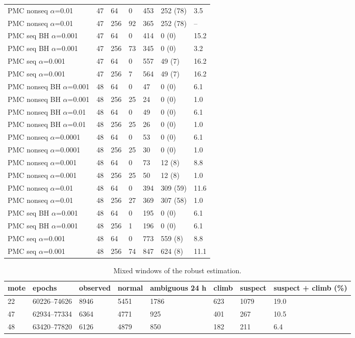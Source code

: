 \begin{table}[ht]
\begin{tabular}{lllllll}
PMC nonseq $\alpha$=0.01 & 47 & 64 & 0 & 453 & 252 (78) & 3.5 \\
PMC nonseq $\alpha$=0.01 & 47 & 256 & 92 & 365 & 252 (78) & -- \\
PMC seq BH $\alpha$=0.001 & 47 & 64 & 0 & 414 & 0 (0) & 15.2 \\
PMC seq BH $\alpha$=0.001 & 47 & 256 & 73 & 345 & 0 (0) & 3.2 \\
PMC seq $\alpha$=0.001 & 47 & 64 & 0 & 557 & 49 (7) & 16.2 \\
PMC seq $\alpha$=0.001 & 47 & 256 & 7 & 564 & 49 (7) & 16.2 \\
PMC nonseq BH $\alpha$=0.001 & 48 & 64 & 0 & 47 & 0 (0) & 6.1 \\
PMC nonseq BH $\alpha$=0.001 & 48 & 256 & 25 & 24 & 0 (0) & 1.0 \\
PMC nonseq BH $\alpha$=0.01 & 48 & 64 & 0 & 49 & 0 (0) & 6.1 \\
PMC nonseq BH $\alpha$=0.01 & 48 & 256 & 25 & 26 & 0 (0) & 1.0 \\
PMC nonseq $\alpha$=0.0001 & 48 & 64 & 0 & 53 & 0 (0) & 6.1 \\
PMC nonseq $\alpha$=0.0001 & 48 & 256 & 25 & 30 & 0 (0) & 1.0 \\
PMC nonseq $\alpha$=0.001 & 48 & 64 & 0 & 73 & 12 (8) & 8.8 \\
PMC nonseq $\alpha$=0.001 & 48 & 256 & 25 & 50 & 12 (8) & 1.0 \\
PMC nonseq $\alpha$=0.01 & 48 & 64 & 0 & 394 & 309 (59) & 11.6 \\
PMC nonseq $\alpha$=0.01 & 48 & 256 & 27 & 369 & 307 (58) & 1.0 \\
PMC seq BH $\alpha$=0.001 & 48 & 64 & 0 & 195 & 0 (0) & 6.1 \\
PMC seq BH $\alpha$=0.001 & 48 & 256 & 1 & 196 & 0 (0) & 6.1 \\
PMC seq $\alpha$=0.001 & 48 & 64 & 0 & 773 & 559 (8) & 8.8 \\
PMC seq $\alpha$=0.001 & 48 & 256 & 74 & 847 & 624 (8) & 11.1 \\
\bottomrule
\end{tabular}
\end{table}

\begin{table}[ht]
\centering\small
\caption{Mixed windows of the robust estimation.}
\label{tab:il-windows}
\begin{tabular}{llllllll}
\toprule
mote & epochs & observed & normal & ambiguous 24 h & climb & suspect & suspect + climb (\%) \\
\midrule
22 & 60226--74626 & 8946 & 5451 & 1786 & 623 & 1079 & 19.0 \\
47 & 62934--77334 & 6364 & 4771 & 925 & 401 & 267 & 10.5 \\
48 & 63420--77820 & 6126 & 4879 & 850 & 182 & 211 & 6.4 \\
\bottomrule
\end{tabular}
\end{table}

